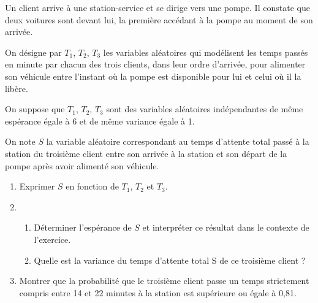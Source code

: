 \documentclass[11pt,fleqn, openany]{book} %
\begin{document}
\begin{exercise}[subtitle={(Métropole 2024, Jour 1 Bis)}]

Un client arrive à une station-service et se dirige vers une pompe. Il constate que deux voitures sont
devant lui, la première accédant à la pompe au moment de son arrivée.

On désigne par $T_1$, $T_2$, $T_3$ les variables aléatoires qui modélisent les temps passés en minute par chacun des trois clients, dans leur ordre d'arrivée, pour alimenter son véhicule entre l'instant où la pompe est disponible pour lui et celui où il la libère.

On suppose que $T_1$, $T_2$, $T_3$ sont des variables aléatoires indépendantes de même espérance égale à 6 et de même variance égale à 1.

On note $S$ la variable aléatoire correspondant au temps d'attente total passé à la station du troisième client entre son arrivée à la station et son départ de la pompe après avoir alimenté son véhicule.
\begin{enumerate}
\item Exprimer $S$ en fonction de $T_1$, $T_2$ et $T_3$.
\item \begin{enumerate}
\item Déterminer l'espérance de $S$ et interpréter ce résultat dans le contexte de l'exercice.
\item Quelle est la variance du temps d'attente total S de ce troisième client ?\end{enumerate}
\item Montrer que la probabilité que le troisième client passe un temps strictement compris entre 14 et 22 minutes à la station est supérieure ou égale à 0,81.
\end{enumerate}
\end{exercise}
\end{document}
